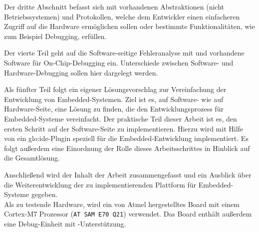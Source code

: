    Der dritte Abschnitt befasst sich mit vorhandenen Abstraktionen (nicht Betriebssystemen) und Protokollen, welche
    dem Entwickler einen einfacheren Zugriff auf die Hardware ermöglichen sollen oder bestimmte Funktionalitäten, wie
    zum Beispiel Debugging, erfüllen.

    Der vierte Teil geht auf die Software-seitige Fehleranalyse mit  und vorhandene Software für On-Chip-Debugging
    ein. Unterschiede zwischen Software- und Hardware-Debugging sollen hier dargelegt werden.

    Als fünfter Teil folgt ein eigener Lösungsvorschlag zur Vereinfachung der Entwicklung von Embedded-Systemen.
    Ziel ist es, auf Software- wie auf Hardware-Seite, eine Lösung zu finden, die den Entwicklungsprozess für
    Embedded-Systeme vereinfacht. Der praktische Teil dieser Arbeit ist es, den ersten Schritt auf der Software-Seite
    zu implementieren. Hierzu wird mit Hilfe von  ein \acrshort{glo:ide}-Plugin speziell für die Embedded-Entwicklung
    implementiert. Es folgt außerdem eine Einordnung der Rolle dieses Arbeitsschrittes in Hinblick auf die Gesamtlösung.

    Anschließend wird der Inhalt der Arbeit zusammengefasst und ein Ausblick über die Weiterentwicklung der zu
    implementierenden Plattform für Embedded-Systeme gegeben.
    \\

    Als zu testende Hardware, wird ein von Atmel hergestelltes Board mit einem Cortex-M7 Prozessor (\texttt{AT SAM E70 Q21})
    verwendet. Das Board enthält außerdem eine Debug-Einheit mit -Unterstützung.